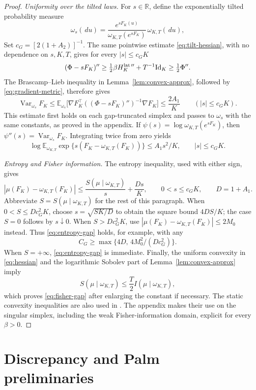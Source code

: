 \documentclass[11pt,reqno]{amsart}
\numberwithin{equation}{section}
\theoremstyle{definition}
\theoremstyle{remark}
\newcommand{\R}{\mathbb R}
\newcommand{\E}{\mathbb E}
\newcommand{\1}{\mathbf 1}
\newcommand{\Var}{\operatorname{Var}}
\newcommand{\Id}{\mathrm{Id}}
\newcommand{\dd}{\,d}
\begin{document}
\begin{proof}
\smallskip\noindent\textit{Uniformity over the tilted laws.}
For $s\in\R$, define the exponentially tilted probability measure
\[
\omega_s(\dd u)=
\frac{e^{sF_K(u)}}{\omega_{K,T}(e^{sF_K})}\,\omega_{K,T}(\dd u),
\]
Set $c_G=[2(1+A_2)]^{-1}$. The same pointwise estimate
\eqref{eq:tilt-hessian}, with no dependence on $s,K,T$, gives
for every $|s|\le c_GK$
\[
(\Phi-sF_K)''
\ge\tfrac12\beta H_K^{{\rm lat}\,\prime\prime}+T^{-1}\Id_K
\ge\tfrac12\Phi''.
\]
The Brascamp--Lieb inequality in Lemma~\ref{lem:convex-approx},
followed by \eqref{eq:gradient-metric}, therefore gives
\[
\Var_{\omega_s}F_K
\le\E_{\omega_s}\bigl[
\nabla F_K^\top((\Phi-sF_K)'')^{-1}\nabla F_K\bigr]
\le\frac{2A_1}{K}
\qquad(|s|\le c_GK).
\]
This estimate first holds on each gap-truncated simplex and passes
to $\omega_s$ with the same constants, as proved in the appendix.
If $\psi(s)=\log\omega_{K,T}(e^{sF_K})$, then
$\psi''(s)=\Var_{\omega_s}F_K$. Integrating twice from zero yields
\begin{equation}\label{eq:mgf}
\log\E_{\omega_{K,T}}
\exp\{s(F_K-\omega_{K,T}(F_K))\}
\le A_1s^2/K,\qquad |s|\le c_GK.
\end{equation}

\smallskip\noindent\textit{Entropy and Fisher information.}
The entropy inequality, used with either sign, gives
\[
|\mu(F_K)-\omega_{K,T}(F_K)|
\le\frac{S(\mu\mid\omega_{K,T})}{s}+\frac{D s}{K},
\qquad 0<s\le c_GK,\qquad D=1+A_1.
\]
Abbreviate $S=S(\mu\mid\omega_{K,T})$ for the rest of this paragraph.
When $0<S\le Dc_G^2K$, choose $s=\sqrt{SK/D}$ to obtain the
square bound $4DS/K$; the case $S=0$ follows by $s\downarrow0$.
When $S>Dc_G^2K$, use
$|\mu(F_K)-\omega_{K,T}(F_K)|\le2M_0$ instead.
Thus \eqref{eq:entropy-gap} holds, for example, with any
\[
C_G\ge\max\{4D,\,4M_0^2/(Dc_G^2)\}.
\]
When $S=+\infty$, \eqref{eq:entropy-gap} is immediate.
Finally, the uniform convexity in \eqref{eq:hessian} and the
logarithmic Sobolev part of Lemma~\ref{lem:convex-approx} imply
\begin{equation}\label{eq:lsi}
S(\mu\mid\omega_{K,T})\le\frac T2 I(\mu\mid\omega_{K,T}),
\end{equation}
which proves \eqref{eq:fisher-gap} after enlarging the constant if
necessary. The static convexity inequalities are also used in
\cite[Sections~3 and 5]{BEY}. The appendix makes their use on the
singular simplex, including the weak Fisher-information domain,
explicit for every $\beta>0$.
\end{proof}


\section{Discrepancy and Palm preliminaries}\label{sec:palm}
\end{document}
